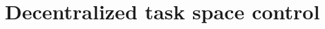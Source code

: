 \documentclass[12pt]{article}
\begin{document}
\makefrontpage
\section{Decentralized task space control}

\newpage

\newpage

\newpage

\newpage

\newpage

\newpage

\end{document}
